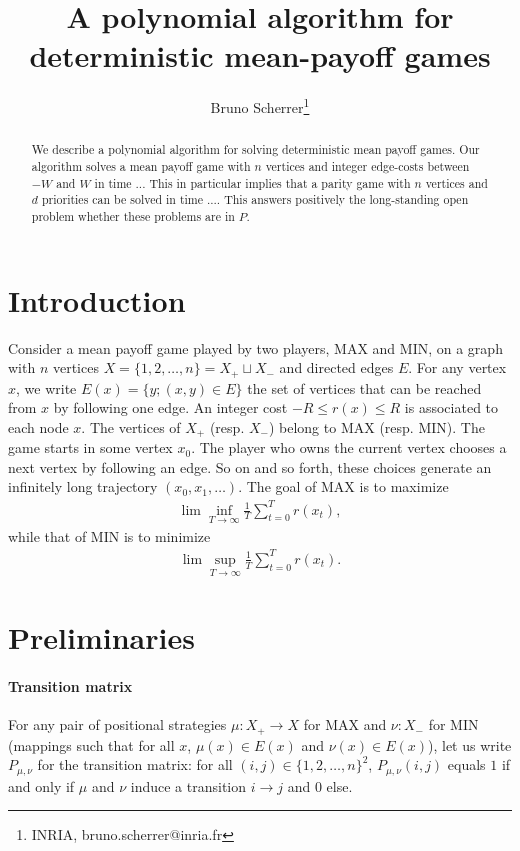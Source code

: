 \documentclass{article}
\title{A polynomial algorithm for deterministic mean-payoff games}
\author{Bruno Scherrer\footnote{INRIA, bruno.scherrer@inria.fr}}
\def\Xmax{X_{+}}
\def\Xmin{X_{-}}
\newcommand{\suc}[1]{E(#1)}
\begin{document}
\maketitle

\begin{abstract}
  We describe a polynomial algorithm for solving deterministic mean payoff games. Our algorithm solves a mean payoff game with $n$ vertices and integer edge-costs between $-W$ and $W$ in time ... This in particular implies that a parity game with $n$ vertices and $d$ priorities can be solved in time .... This answers positively the long-standing open problem whether these problems are in $P$.
\end{abstract}

\section*{Introduction}

Consider a mean payoff game played by two players, MAX and MIN, on a graph with $n$ vertices $X=\{1,2,\dots,n\}=\Xmax \sqcup \Xmin$ and directed edges $E$. For any vertex $x$, we write $\suc{x}=\{y;(x,y) \in E\}$ the set of vertices that can be reached from $x$ by following one edge. An integer cost $-R \le r(x) \le R$ is associated to each node $x$. The vertices of $\Xmax$ (resp. $\Xmin$) belong to MAX (resp. MIN). The game starts in some vertex $x_0$. The player who owns the current vertex chooses a next vertex by following an edge. So on and so forth, these choices generate an infinitely long trajectory $(x_0,x_1,\dots)$. The goal of MAX is to maximize
\begin{align}
\lim\inf_{T \to \infty} \frac 1 T \sum_{t=0}^{T}  r(x_t),
\end{align}
while that of MIN is to minimize
\begin{align}
\lim\sup_{T \to \infty} \frac 1 T \sum_{t=0}^{T}  r(x_t).
\end{align}

\section{Preliminaries}

\paragraph{Transition matrix}

For any pair of positional strategies $\mu:\Xmax \to X$ for MAX and $\nu:\Xmin$ for MIN (mappings such that for all $x$, $\mu(x) \in \suc{x}$ and $\nu(x) \in \suc{x}$), let us write $P_{\mu,\nu}$ for the transition matrix: for all $(i,j) \in \{1,2,\dots,n\}^2$, $P_{\mu,\nu}(i,j)$ equals $1$ if and only if $\mu$ and $\nu$ induce a transition $i \to j$ and $0$ else. 
\end{document}
